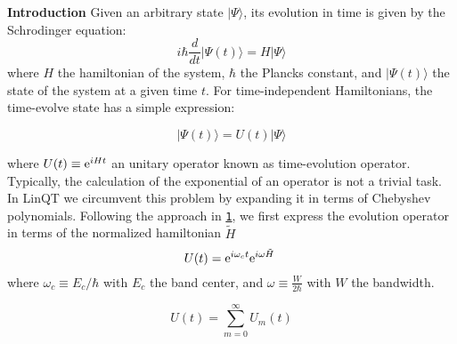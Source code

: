 {\bfseries Introduction} Given an arbitrary state $|\Psi\rangle$, its evolution in time is given by the Schrodinger equation\+: \[ i\hbar \frac{d}{dt}|\Psi(t)\rangle = H |\Psi\rangle \] where $H$ the hamiltonian of the system, $\hbar$ the Planck\textquotesingle{}s constant, and $|\Psi(t)\rangle$ the state of the system at a given time $t$. For time-\/independent Hamiltonians, the time-\/evolve state has a simple expression\+:

\[ |\Psi(t)\rangle = U(t)|\Psi\rangle \]

where $U(t)\equiv{\rm e}^{i H t}$ an unitary operator known as time-\/evolution operator. Typically, the calculation of the exponential of an operator is not a trivial task. In Lin\+QT we circumvent this problem by expanding it in terms of Chebyshev polynomials. Following the approach in \href{https://journals.aps.org/rmp/abstract/10.1103/RevModPhys.78.275}{\tt 1}, we first express the evolution operator in terms of the normalized hamiltonian $\tilde{H}$ \[ U(t)={\rm e}^{i \omega_c t} {\rm e}^{i \omega \tilde{H}}\ \] where $\omega_c\equiv E_c/\hbar$ with $E_c$ the band center, and $\omega\equiv\frac{W}{2\hbar}$ with $W$ the bandwidth.

\[ U(t) = \sum_{m=0}^{\infty} U_m(t) \] 